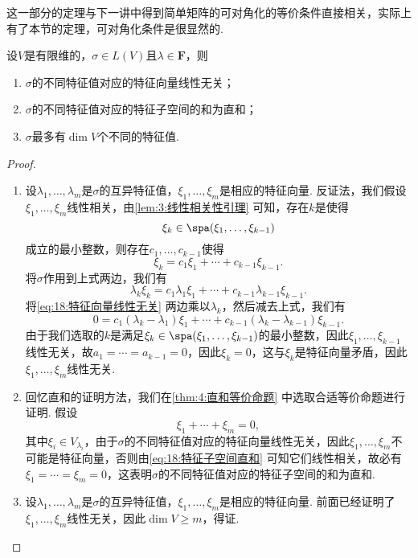 这一部分的定理与下一讲中得到简单矩阵的可对角化的等价条件直接相关，实际上有了本节的定理，可对角化条件是很显然的.
\begin{theorem}\label{thm:18:特征向量的基本性质}
    设$V$是有限维的，$\sigma\in L(V)$且$\lambda\in\mathbf{F}$，则
    \begin{enumerate}
        \item $\sigma$的不同特征值对应的特征向量线性无关；

        \item $\sigma$的不同特征值对应的特征子空间的和为直和；

        \item $\sigma$最多有$\dim V$个不同的特征值.
    \end{enumerate}
\end{theorem}

\begin{proof}
    \begin{enumerate}
        \item 设$\lambda_1,\ldots,\lambda_m$是$\sigma$的互异特征值，$\xi_1,\ldots,\xi_m$是相应的特征向量. 反证法，我们假设$\xi_1,\ldots,\xi_m$线性相关，由\autoref{lem:3:线性相关性引理} 可知，存在$k$是使得
              \[\xi_k\in\spa(\xi_1,\ldots,\xi_{k-1})\]
              成立的最小整数，则存在$c_1,\ldots,c_{k-1}$使得
              \begin{equation}\label{eq:18:特征向量线性无关}
                  \xi_k=c_1\xi_1+\cdots+c_{k-1}\xi_{k-1}.
              \end{equation}
              将$\sigma$作用到上式两边，我们有
              \[\lambda_k\xi_k=c_1\lambda_1\xi_1+\cdots+c_{k-1}\lambda_{k-1}\xi_{k-1}.\]
              将\autoref{eq:18:特征向量线性无关} 两边乘以$\lambda_k$，然后减去上式，我们有
              \[0=c_1(\lambda_k-\lambda_1)\xi_1+\cdots+c_{k-1}(\lambda_k-\lambda_{k-1})\xi_{k-1}.\]
              由于我们选取的$k$是满足$\xi_k\in\spa(\xi_1,\ldots,\xi_{k-1})$的最小整数，因此$\xi_1,\ldots,\xi_{k-1}$线性无关，故$a_1=\cdots=a_{k-1}=0$，因此$\xi_k=0$，这与$\xi_k$是特征向量矛盾，因此$\xi_1,\ldots,\xi_m$线性无关.

        \item 回忆直和的证明方法，我们在\autoref{thm:4:直和等价命题} 中选取合适等价命题进行证明. 假设
              \begin{equation}\label{eq:18:特征子空间直和}
                  \xi_1+\cdots+\xi_m=0,
              \end{equation}
              其中$\xi_i\in V_{\lambda_i}$，由于$\sigma$的不同特征值对应的特征向量线性无关，因此$\xi_1,\ldots,\xi_m$不可能是特征向量，否则由\autoref{eq:18:特征子空间直和} 可知它们线性相关，故必有$\xi_1=\cdots=\xi_m=0$，这表明$\sigma$的不同特征值对应的特征子空间的和为直和.

        \item 设$\lambda_1,\ldots,\lambda_m$是$\sigma$的互异特征值，$\xi_1,\ldots,\xi_m$是相应的特征向量. 前面已经证明了$\xi_1,\ldots,\xi_m$线性无关，因此$\dim V\geqslant m$，得证.
    \end{enumerate}
\end{proof}

